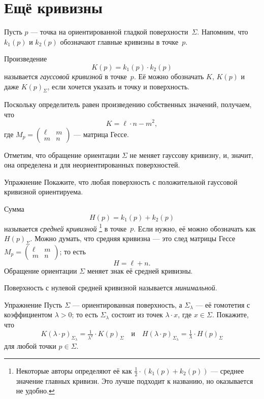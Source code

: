 \section{Ещё кривизны}\label{sec:More curvatures}

Пусть $p$ --- точка на ориентированной гладкой поверхности~$\Sigma$.
Напомним, что $k_1(p)$ и $k_2(p)$ обозначают главные кривизны в точке~$p$.

Произведение 
\[K(p)=k_1(p)\cdot k_2(p)\]
называется \emph{гауссовой кривизной} в точке~$p$.
Её можно обозначать $K$, $K(p)$ и даже $K(p)_\Sigma$, если хочется указать и точку и поверхность.

Поскольку определитель равен произведению собственных значений, получаем, что
\[K=\ell\cdot n-m^2,\]
где 
$M_p=
(\begin{smallmatrix}
\ell&m
\\
m&n
\end{smallmatrix}
)$
--- матрица Гессе.

Отметим, что обращение ориентации $\Sigma$ не меняет гауссову кривизну,
и, значит, она определена и для неориентированных поверхностей.

\begin{thm}{Упражнение}\label{ex:gauss+orientable}
Покажите, что любая поверхность с положительной гауссовой кривизной ориентируема. 
\end{thm}

Сумма 
\[H(p)=k_1(p)+ k_2(p)\] 
называется \emph{средней кривизной}%
\footnote{Некоторые авторы определяют её как $\tfrac12\cdot(k_1(p)+ k_2(p))$ --- среднее значение главных кривизн.
Это лучше подходит к названию, но оказывается не удобно.}
в точке~$p$.
Если нужно, её можно обозначать как $H(p)_\Sigma$.
Можно думать, что средняя кривизна --- это след матрицы Гессе $M_p=
(\begin{smallmatrix}
\ell&m
\\
m&n
\end{smallmatrix}
)$;
то есть
\[H=\ell+n.\] 
Обращение ориентации $\Sigma$ меняет знак её средней кривизны.

Поверхность с нулевой средней кривизной называется \emph{минимальной}.

\begin{thm}{Упражнение}\label{ex:re-scale-surface-curvature}
Пусть $\Sigma$ --- ориентированная поверхность, а $\Sigma_{\lambda}$ --- её гомотетия с коэффициентом $\lambda > 0$; то есть $\Sigma_{\lambda}$ состоит из точек $\lambda \cdot x$, где $x \in \Sigma$.
Покажите, что
\[K(\lambda\cdot p)_{\Sigma_{\lambda}}
= \tfrac{1}{\lambda^2}\cdot K(p)_{\Sigma}
\quad\text{и}\quad
H(\lambda \cdot p)_{\Sigma_{\lambda}} = \tfrac1\lambda\cdot H(p)_{\Sigma}\]
для любой точки $p\in \Sigma$.  
\end{thm}


